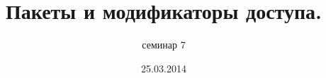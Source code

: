 \documentclass[hyperref={unicode,colorlinks=true,urlbordercolor=blue,linkcolor=blue,urlcolor=blue,pdfborderstyle={/S/U/W 1}}]{beamer}
\title{Пакеты и модификаторы доступа.}
\subtitle{семинар 7}
\date{25.03.2014}
\begin{document}
\frame{\titlepage}


\end{document}
